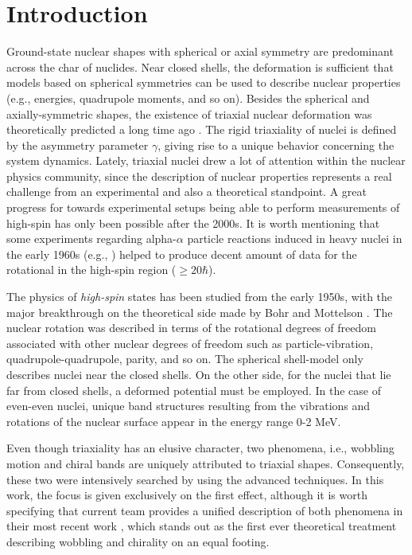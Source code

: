 \chapter{Introduction}

Ground-state nuclear shapes with spherical or axial symmetry are predominant across the char of nuclides. Near closed shells, the deformation is sufficient that models based on spherical symmetries can be used to describe nuclear properties (e.g., energies, quadrupole moments, and so on). Besides the spherical and axially-symmetric shapes, the existence of triaxial nuclear deformation was theoretically predicted a long time ago \cite{bohr1998nuclear}. The rigid triaxiality of nuclei is defined by the asymmetry parameter $\gamma$, giving rise to a unique behavior concerning the system dynamics. Lately, triaxial nuclei drew a lot of attention within the nuclear physics community, since the description of nuclear properties represents a real challenge from an experimental and also a theoretical standpoint. A great progress for towards experimental setups being able to perform measurements of high-spin has only been possible after the 2000s. It is worth mentioning that some experiments regarding alpha-$\alpha$ particle reactions induced in heavy nuclei in the early 1960s (e.g., \cite{morinaga1963gamma}) helped to produce decent amount of data for the rotational in the high-spin region ($\geq 20 \hbar$).

The physics of \emph{high-spin} states has been studied from the early 1950s, with the major breakthrough on the theoretical side made by Bohr and Mottelson \cite{bohr1998nuclear}. The nuclear rotation was described in terms of the rotational degrees of freedom associated with other nuclear degrees of freedom such as particle-vibration, quadrupole-quadrupole, parity, and so on. The spherical shell-model only describes nuclei near the closed shells. On the other side, for the nuclei that lie far from closed shells, a deformed potential must be employed. In the case of even-even nuclei, unique band structures resulting from the vibrations and rotations of the nuclear surface appear in the energy range 0-2 MeV. 

Even though triaxiality has an elusive character, two phenomena, i.e., wobbling motion and chiral bands are uniquely attributed to triaxial shapes. Consequently, these two were intensively searched by using the advanced techniques. In this work, the focus is given exclusively on the first effect, although it is worth specifying that current team provides a unified description of both phenomena in their most recent work \cite{raduta2022simultaneous}, which stands out as the first ever theoretical treatment describing wobbling and chirality on an equal footing.

